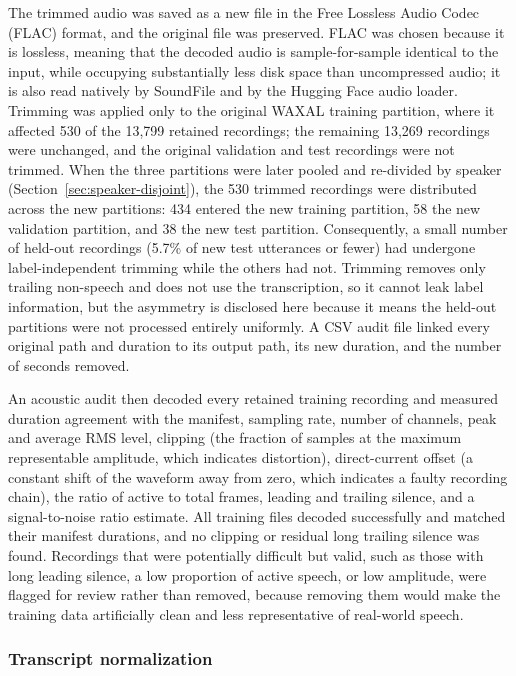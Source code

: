 The trimmed audio was saved as a new file in the Free Lossless Audio Codec (FLAC)
format, and the original file was preserved. FLAC was chosen because it is
lossless, meaning that the decoded audio is sample-for-sample identical to the
input, while occupying substantially less disk space than uncompressed audio; it
is also read natively by SoundFile and by the Hugging Face audio loader. Trimming
was applied only to the original WAXAL training partition, where it affected 530
of the 13,799 retained recordings; the remaining 13,269 recordings were
unchanged, and the original validation and test recordings were not trimmed.
When the three partitions were later pooled and re-divided by speaker
(Section~\ref{sec:speaker-disjoint}), the 530 trimmed recordings were
distributed across the new partitions: 434 entered the new training partition,
58 the new validation partition, and 38 the new test partition. Consequently, a
small number of held-out recordings (5.7\% of new test utterances or fewer)
had undergone label-independent trimming while the others had not. Trimming
removes only trailing non-speech and does not use the transcription, so it
cannot leak label information, but the asymmetry is disclosed here because it
means the held-out partitions were not processed entirely uniformly. A CSV audit file linked every original path and
duration to its output path, its new duration, and the number of seconds removed.

An acoustic audit then decoded every retained training recording and measured
duration agreement with the manifest, sampling rate, number of channels, peak and
average RMS level, clipping (the fraction of samples at the maximum representable
amplitude, which indicates distortion), direct-current offset (a constant shift of
the waveform away from zero, which indicates a faulty recording chain), the ratio
of active to total frames, leading and trailing silence, and a signal-to-noise
ratio estimate. All training files decoded successfully and matched their manifest
durations, and no clipping or residual long trailing silence was found.
Recordings that were potentially difficult but valid, such as those with long
leading silence, a low proportion of active speech, or low amplitude, were flagged
for review rather than removed, because removing them would make the training data
artificially clean and less representative of real-world speech.

\subsubsection{Transcript normalization}
\label{sec:normalization}

